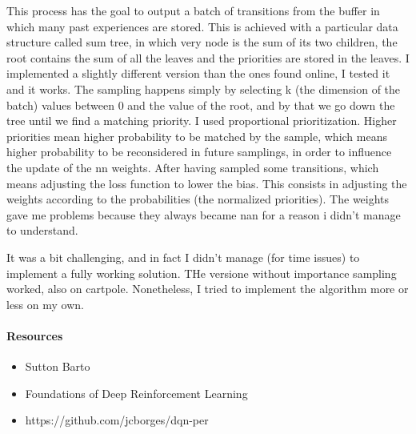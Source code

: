 \documentclass[12pt,a4paper]{extarticle}
\begin{document}
This process has the goal to output a batch of transitions from the buffer in which many past experiences are stored. This is achieved with a particular data structure called sum tree, in which very node is the sum of its two children, the root contains the sum of all the leaves and the priorities are stored in the leaves. I implemented a slightly different version than the ones found online, I tested it and it works. The sampling happens simply by selecting k (the dimension of the batch) values between 0 and the value of the root, and by that we go down the tree until we find a matching priority. I used proportional prioritization. Higher priorities mean higher probability to be matched by the sample, which means higher probability to be reconsidered in future samplings, in order to influence the update of the nn weights. After having sampled some transitions, which means adjusting the loss function to lower the bias. This consists in adjusting the weights according to the probabilities (the normalized priorities). The weights gave me problems because they always became nan for a reason i didn't manage to understand.


It was a bit challenging, and in fact I didn't manage (for time issues) to implement a fully working solution. THe versione without importance sampling worked, also on cartpole. Nonetheless, I tried to implement the algorithm more or less on my own.


\paragraph {Resources}
\begin{itemize}
\item Sutton Barto
\item Foundations of Deep Reinforcement Learning
\item https://github.com/jcborges/dqn-per
\end{itemize}
\end{document}
